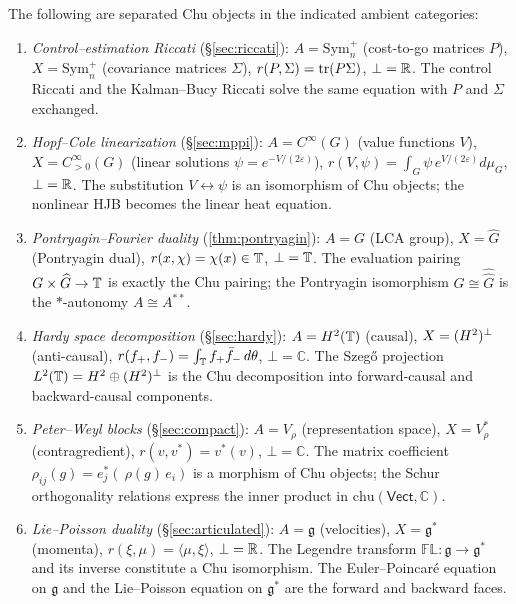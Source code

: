 \begin{proposition}\label{prop:eight-chu}
The following are separated Chu objects in the indicated ambient
categories:
\begin{enumerate}[label=\textup{(\roman*)},nosep]
\item \emph{Control--estimation Riccati}
  \textup{(\S\ref{sec:riccati}):}
  $A = \mathrm{Sym}^+_n$ (cost-to-go matrices $P$),
  $X = \mathrm{Sym}^+_n$ (covariance matrices $\Sigma$),
  $r(P, \Sigma) = \operatorname{tr}(P\Sigma)$,
  $\bot = \mathbb{R}$.
  The control Riccati and the Kalman--Bucy Riccati solve the same
  equation with $P$ and $\Sigma$ exchanged.

\item \emph{Hopf--Cole linearization}
  \textup{(\S\ref{sec:mppi}):}
  $A = C^\infty(G)$ (value functions $V$),
  $X = C^\infty_{>0}(G)$ (linear solutions
  $\psi = e^{-V/(2\varepsilon)}$),
  $r(V, \psi) = \int_G \psi\, e^{V/(2\varepsilon)} d\mu_G$,
  $\bot = \mathbb{R}$.
  The substitution $V \leftrightarrow \psi$ is an isomorphism of
  Chu objects; the nonlinear HJB becomes the linear heat equation.

\item \emph{Pontryagin--Fourier duality}
  \textup{(\cref{thm:pontryagin}):}
  $A = G$ (LCA group),
  $X = \widehat{G}$ (Pontryagin dual),
  $r(x, \chi) = \chi(x) \in \mathbb{T}$,
  $\bot = \mathbb{T}$.
  The evaluation pairing $G \times \widehat{G} \to \mathbb{T}$ is exactly the
  Chu pairing; the Pontryagin isomorphism $G \cong
  \widehat{\widehat{G}}$ is the $*$-autonomy $A \cong A^{**}$.

\item \emph{Hardy space decomposition}
  \textup{(\S\ref{sec:hardy}):}
  $A = H^2(\mathbb{T})$ (causal),
  $X = (H^2)^\perp$ (anti-causal),
  $r(f_+, f_-) = \int_{\mathbb{T}} f_+ \bar{f}_-\, d\theta$,
  $\bot = \mathbb{C}$.
  The Szeg\H{o} projection
  $L^2(\mathbb{T}) = H^2 \oplus (H^2)^\perp$
  is the Chu decomposition into forward-causal and backward-causal
  components.

\item \emph{Peter--Weyl blocks}
  \textup{(\S\ref{sec:compact}):}
  $A = V_\rho$ (representation space),
  $X = V_\rho^*$ (contragredient),
  $r(v, v^*) = v^*(v)$,
  $\bot = \mathbb{C}$.
  The matrix coefficient
  $\rho_{ij}(g) = e_j^*(\ \rho(g)\, e_i)$ is a morphism of Chu
  objects; the Schur orthogonality relations express the inner product
  in $\mathrm{chu}(\mathsf{Vect}, \mathbb{C})$.

\item \emph{Lie--Poisson duality}
  \textup{(\S\ref{sec:articulated}):}
  $A = \mathfrak{g}$ (velocities),
  $X = \mathfrak{g}^*$ (momenta),
  $r(\xi, \mu) = \langle \mu, \xi \rangle$,
  $\bot = \mathbb{R}$.
  The Legendre transform
  $\mathbb{FL} \colon \mathfrak{g} \to \mathfrak{g}^*$ and its inverse
  constitute a Chu isomorphism.
  The Euler--Poincar\'e equation on $\mathfrak{g}$ and the Lie--Poisson
  equation on $\mathfrak{g}^*$ are the forward and backward faces.


\end{enumerate}
\end{proposition}
